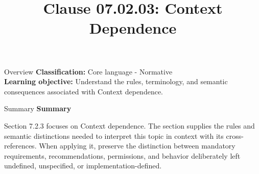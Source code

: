 \documentclass[10pt,letterpaper]{article}
\title{Clause 07.02.03: Context Dependence}
\author{}
\date{}
\begin{document}
\maketitle
\begin{CornellOverviewBox}{Overview}
\textbf{Classification:} Core language - Normative\\[2pt]
\textbf{Learning objective:} Understand the rules, terminology, and semantic consequences associated with Context dependence.
\end{CornellOverviewBox}\begin{CornellSummaryBox}{Summary}
{\sffamily\bfseries\color{Accent} Summary}\par\vspace{3pt}Section 7.2.3 focuses on Context dependence. The section supplies the rules and semantic distinctions needed to interpret this topic in context with its cross-references. When applying it, preserve the distinction between mandatory requirements, recommendations, permissions, and behavior deliberately left undefined, unspecified, or implementation-defined.
\end{CornellSummaryBox}
\end{document}
